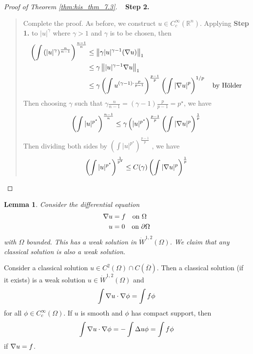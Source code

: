 \documentclass[10pt, oneside, reqno]{amsart}
\theoremstyle{plain}%
\newtheorem{lem}[thm]{Lemma}
\numberwithin{equation}{section}
\theoremstyle{definition}
\theoremstyle{remark}
\newcommand{\R}{\mathbb{R}}
\begin{document}
\begin{proof}[Proof of Theorem \ref{thm:his_thm_7.3}]{\ }
	\textbf{Step 2.}
	\begin{quote}
 Complete the proof.  As before, we construct $u \in C^\infty_c(\R^n)$.  Applying \textbf{Step 1.} to $|u|^\gamma$ where $\gamma > 1$ and $\gamma$ is to be chosen, then \begin{align*}
		\left( \int \left( |u|^\gamma \right)^{\frac{n}{n-1}} \right)^{\frac{n-1}{n}} &\leq \left\| \gamma |u|^{\gamma - 1} (\nabla u) \right\|_1 \\
		&\leq \gamma \left\| |u|^{\gamma - 1} \nabla u \right\|_1 \\
		&\leq \gamma \left( \int u^{(\gamma - 1) \cdot \frac{p}{p-1}}\right)^{\frac{p-1}{p}} \left( \int \left| \nabla u \right|^p \right)^{1/p} \quad \text{by H\"older}
	\end{align*} 
	 Then choosing $\gamma$ such that $\gamma \frac{n}{n-1} = \left( \gamma - 1 \right) \frac{p}{p-1} = p^\star$,  we have \begin{align*}
		\left( \int |u|^{p^\star} \right)^{\frac{n-1}{n}} \leq \gamma \left( |u|^{p^\star} \right)^{\frac{p-1}{p}} \left( \int |\nabla u |^p \right)^{\frac{1}{p}}
	\end{align*}  Then dividing both sides by $\left(\int |u|^{p^\star} \right)^{\frac{p-1}{p}}$ , we have \begin{align*}
		\left(\int|u|^{p^\star} \right)^{\frac{1}{p^\star}} \leq C(\gamma) \left(\int |\nabla u |^p \right)^{\frac{1}{p}}
	\end{align*}

	\end{quote}

\end{proof}


\begin{lem}
	Consider the differential equation \begin{align*}
		\nabla u &= f \quad \text{on $\Omega$} \\
		u &= 0	\quad \text{on $\partial \Omega$}
	\end{align*} with $\Omega$ bounded.  This has a weak solution in $\dot W^{1, 2}(\Omega)$.  We claim that any classical solution is also a weak solution.
\end{lem}


Consider a classical solution $u \in C^2(\Omega) \cap C(\overline \Omega)$.  Then a classical solution (if it exists) is a weak solution $u \in \dot W^{1, 2}(\Omega)$ and \[
	\int \nabla u \cdot \nabla \phi = \int f \phi
\]  for all $\phi \in C^\infty_c(\Omega)$.  If $u$ is smooth and $\phi$ has compact support, then \[
	\int \nabla u \cdot \nabla \phi = - \int \Delta u \phi = \int f \phi
\] if $\nabla u = f$. 
\end{document}
